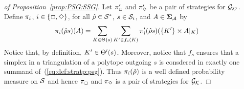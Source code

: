 \begin{proof}[of Proposition~\ref{prop:PSG:SSG}]
  Let $\pi'_{{\Box}}$ and $\pi'_{{\Diamond}}$ be a pair of
  strategies for ${\mathcal{G}_{\mathcal{K}'}}$.  Define $\pi_{i}$,
  $i\in\{{\Box},{\Diamond}\}$, for all $\hat{\rho}\in\mathcal{S}^*$,
  $s\in\mathcal{S}_{i}$, and $A\in\bm{\Sigma}_{\mathcal{A}}$ by
%
  \begin{equation}\label{eq:def:stratp:psg}
    \pi_{i}(\hat{\rho}s)(A) = \sum_{K\in\Theta(s)} \sum_{K'\in f_{s}(K)} \pi'_{i}(\hat{\rho}s)(\{K'\}\times{A{|_{K}}})
  \end{equation}
%
  Notice that, by definition, $K'\in\Theta'(s)$.
  Moreover, notice that $f_s$ ensures that a simplex in a
  triangulation of a polytope outgoing $s$ is consdered in exactly one
  summand of~(\ref{eq:def:stratp:psg}).  Thus $\pi_{i}(\hat{\rho})$
  is a well defined probability measure on $\mathcal{S}$ and hence
  $\pi_{{\Box}}$ and $\pi_{{\Diamond}}$ is a pair of strategies
  for ${\mathcal{G}_{\mathcal{K}}}$.


\end{proof}

